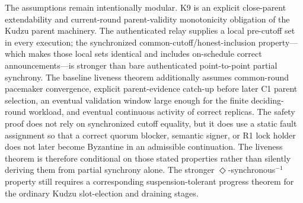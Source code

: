 \documentclass[11pt]{article}
\theoremstyle{definition}
\theoremstyle{remark}
\begin{document}
The assumptions remain intentionally modular. K9 is an explicit close-parent extendability and current-round parent-validity monotonicity obligation of the Kudzu parent machinery. The authenticated relay supplies a local pre-cutoff set in every execution; the synchronized common-cutoff/honest-inclusion property---which makes those local sets identical and includes on-schedule correct announcements---is stronger than bare authenticated point-to-point partial synchrony. The baseline liveness theorem additionally assumes common-round pacemaker convergence, explicit parent-evidence catch-up before later C1 parent selection, an eventual validation window large enough for the finite deciding-round workload, and eventual continuous activity of correct replicas. The safety proof does not rely on synchronized cutoff equality, but it does use a static fault assignment so that a correct quorum blocker, semantic signer, or R1 lock holder does not later become Byzantine in an admissible continuation. The liveness theorem is therefore conditional on those stated properties rather than silently deriving them from partial synchrony alone. The stronger $\Diamond$-synchronous$^{-1}$ property still requires a corresponding suspension-tolerant progress theorem for the ordinary Kudzu slot-election and draining stages.
\end{document}
